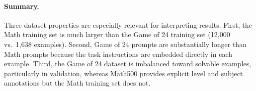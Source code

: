 \paragraph{Summary.}
Three dataset properties are especially relevant for interpreting results. First, the Math training set is much larger than the Game of 24 training set (12{,}000 vs.\ 1{,}638 examples). Second, Game of 24 prompts are substantially longer than Math prompts because the task instructions are embedded directly in each example. Third, the Game of 24 dataset is imbalanced toward solvable examples, particularly in validation, whereas Math500 provides explicit level and subject annotations but the Math training set does not.
